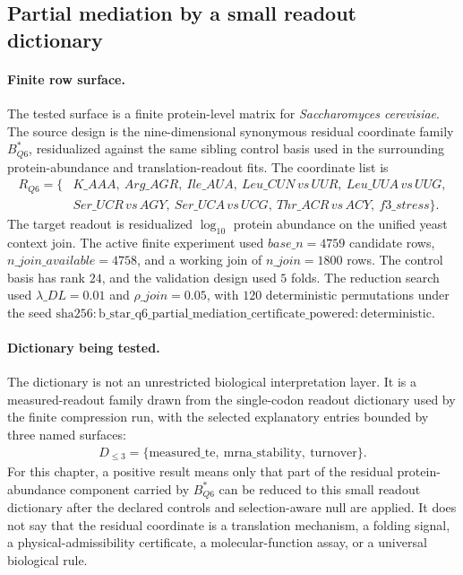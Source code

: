 \subsection{Partial mediation by a small readout dictionary}\label{sec:bioreality-q6-partial-mediation-readout-dictionary}

\paragraph{Finite row surface.}
The tested surface is a finite protein-level matrix for \emph{Saccharomyces cerevisiae}.  The source design is the nine-dimensional synonymous residual coordinate family $B^{\ast}_{Q6}$, residualized against the same sibling control basis used in the surrounding protein-abundance and translation-readout fits.  The coordinate list is
$$
\begin{aligned}
R_{Q6}=\{&K\_{AAA},\ Arg\_{AGR},\ Ile\_{AUA},\ Leu\_{CUN\,vs\,UUR},\ Leu\_{UUA\,vs\,UUG},\\
&Ser\_{UCR\,vs\,AGY},\ Ser\_{UCA\,vs\,UCG},\ Thr\_{ACR\,vs\,ACY},\ f3\_{stress}\}.
\end{aligned}
$$
The target readout is residualized $\log_{10}$ protein abundance on the unified yeast context join.  The active finite experiment used $base\_n=4759$ candidate rows, $n\_{join\_available}=4758$, and a working join of $n\_{join}=1800$ rows.  The control basis has rank $24$, and the validation design used $5$ folds.  The reduction search used $\lambda\_{DL}=0.01$ and $\rho\_{join}=0.05$, with $120$ deterministic permutations under the seed $\mathrm{sha256{:}b\_star\_q6\_partial\_mediation\_certificate\_powered{:}deterministic}$.

\paragraph{Dictionary being tested.}
The dictionary is not an unrestricted biological interpretation layer.  It is a measured-readout family drawn from the single-codon readout dictionary used by the finite compression run, with the selected explanatory entries bounded by three named surfaces:
$$
\begin{aligned}
D_{\leq 3}=\{\mathrm{measured\_te},\ \mathrm{mrna\_stability},\ \mathrm{turnover}\}.
\end{aligned}
$$
For this chapter, a positive result means only that part of the residual protein-abundance component carried by $B^{\ast}_{Q6}$ can be reduced to this small readout dictionary after the declared controls and selection-aware null are applied.  It does not say that the residual coordinate is a translation mechanism, a folding signal, a physical-admissibility certificate, a molecular-function assay, or a universal biological rule.

